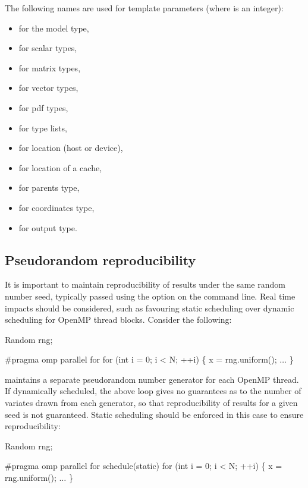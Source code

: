The following names are used for template parameters (where  is an
integer):
\begin{itemize}
\item {} for the model type,
\item {} for scalar types,
\item {} for matrix types,
\item {} for vector types,
\item {} for pdf types,
\item {} for type lists,
\item {} for location (host or device),
\item {} for location of a cache,
\item {} for parents type,
\item {} for coordinates type,
\item {} for output type.
\end{itemize}

\subsection{Pseudorandom reproducibility\label{Pseudorandom_reproducibility}}

It is important to maintain reproducibility of results under the same random
number seed, typically passed using the
 option on the command line. Real time impacts should be
considered, such as favouring static scheduling over
dynamic scheduling for OpenMP thread
blocks. Consider the following:
\begin{cppcode}
Random rng;

#pragma omp parallel for
for (int i = 0; i < N; ++i) \{
  x = rng.uniform();
  \(\ldots\)
\}
\end{cppcode}

 maintains a separate pseudorandom number
generator for each OpenMP thread. If
dynamically scheduled, the above loop gives no guarantees as to the number of
variates drawn from each generator, so that reproducibility of results for a
given seed is not guaranteed. Static scheduling should be enforced in this
case to ensure reproducibility:
\begin{cppcode}
Random rng;

#pragma omp parallel for schedule(static)
for (int i = 0; i < N; ++i) \{
  x = rng.uniform();
  \(\ldots\)
\}
\end{cppcode}

